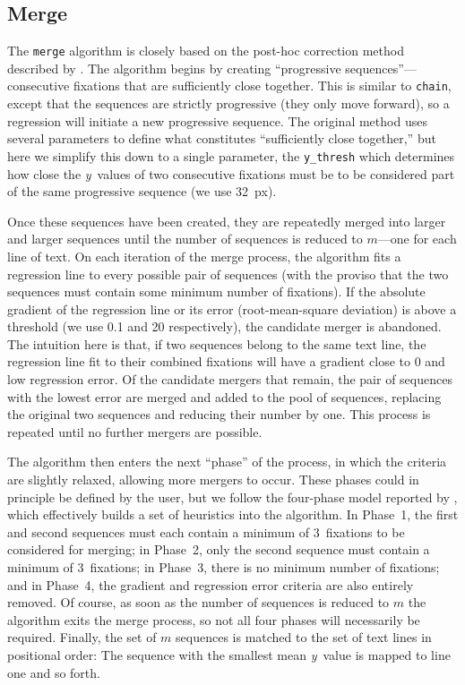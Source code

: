\documentclass[doc,biblatex]{apa7}
\begin{document}
\subsection{Merge}

The \texttt{merge} algorithm is closely based on the post-hoc correction method described by \textcite{Spakov:2019}. The algorithm begins by creating ``progressive sequences''---consecutive fixations that are sufficiently close together. This is similar to \texttt{chain}, except that the sequences are strictly progressive (they only move forward), so a regression will initiate a new progressive sequence. The original method uses several parameters to define what constitutes ``sufficiently close together,'' but here we simplify this down to a single parameter, the \texttt{y\_thresh} which determines how close the \textit{y}~values of two consecutive fixations must be to be considered part of the same progressive sequence (we use 32~px).

Once these sequences have been created, they are repeatedly merged into larger and larger sequences until the number of sequences is reduced to $m$---one for each line of text. On each iteration of the merge process, the algorithm fits a regression line to every possible pair of sequences (with the proviso that the two sequences must contain some minimum number of fixations). If the absolute gradient of the regression line or its error (root-mean-square deviation) is above a threshold (we use 0.1 and 20 respectively), the candidate merger is abandoned. The intuition here is that, if two sequences belong to the same text line, the regression line fit to their combined fixations will have a gradient close to 0 and low regression error. Of the candidate mergers that remain, the pair of sequences with the lowest error are merged and added to the pool of sequences, replacing the original two sequences and reducing their number by one. This process is repeated until no further mergers are possible.

The algorithm then enters the next ``phase'' of the process, in which the criteria are slightly relaxed, allowing more mergers to occur. These phases could in principle be defined by the user, but we follow the four-phase model reported by \textcite{Spakov:2019}, which effectively builds a set of heuristics into the algorithm. In Phase~1, the first and second sequences must each contain a minimum of 3~fixations to be considered for merging; in Phase~2, only the second sequence must contain a minimum of 3~fixations; in Phase~3, there is no minimum number of fixations; and in Phase~4, the gradient and regression error criteria are also entirely removed. Of course, as soon as the number of sequences is reduced to $m$ the algorithm exits the merge process, so not all four phases will necessarily be required. Finally, the set of $m$ sequences is matched to the set of text lines in positional order: The sequence with the smallest mean \textit{y}~value is mapped to line one and so forth.
\end{document}
